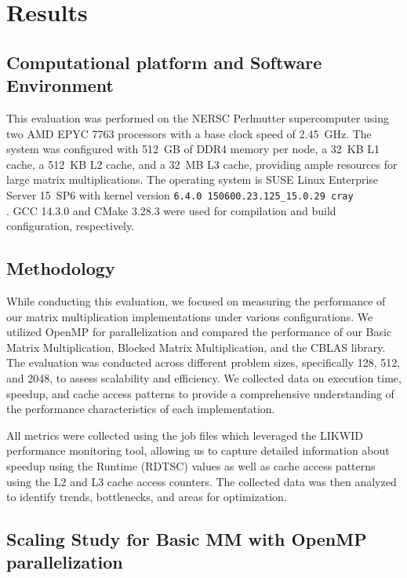 \section{Results}

\subsection{Computational platform and Software Environment}

This evaluation was performed on the NERSC Perlmutter supercomputer using two AMD EPYC 7763 processors with a base clock speed of 2.45~GHz. The system was configured with 512~GB of DDR4 memory per node, a 32~KB L1 cache, a 512~KB L2 cache, and a 32~MB L3 cache, providing ample resources for large matrix multiplications. The operating system is SUSE Linux Enterprise Server 15~SP6 with kernel version \texttt{6.4.0 150600.23.125\_15.0.29 cray}\\ \texttt{}. GCC 14.3.0 and CMake 3.28.3 were used for compilation and build configuration, respectively. \cite{nersc}

\subsection{Methodology}

While conducting this evaluation, we focused on measuring the performance of our matrix multiplication implementations under various configurations. We utilized OpenMP for parallelization and compared the performance of our Basic Matrix Multiplication, Blocked Matrix Multiplication, and the CBLAS library. The evaluation was conducted across different problem sizes, specifically 128, 512, and 2048, to assess scalability and efficiency. We collected data on execution time, speedup, and cache access patterns to provide a comprehensive understanding of the performance characteristics of each implementation.

All metrics were collected using the job files which leveraged the LIKWID performance monitoring tool, allowing us to capture detailed information about speedup using the Runtime (RDTSC) values as well as cache access patterns using the L2 and L3 cache access counters. The collected data was then analyzed to identify trends, bottlenecks, and areas for optimization.

\subsection{Scaling Study for Basic MM with OpenMP parallelization}

